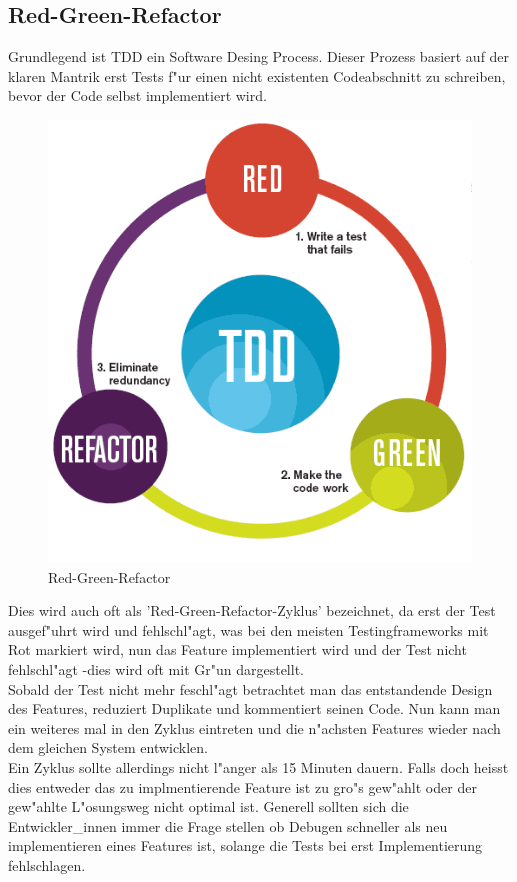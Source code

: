 \documentclass[runningheads,a4paper]{llncs}
\begin{document}
  \subsection{Red-Green-Refactor}
    Grundlegend ist TDD ein Software Desing Process. Dieser Prozess basiert auf 
    der klaren Mantrik erst Tests f"ur einen nicht existenten Codeabschnitt zu
    schreiben, bevor der Code selbst implementiert wird.\\
    \begin{figure}
      \vspace{-30pt}
      \begin{center}
        \includegraphics[scale=0.3]{assets/tdd_flow.png}
      \end{center}
      \caption{Red-Green-Refactor\cite{Osorio:2012}}
      \vspace{-15pt}
    \end{figure}
    Dies wird auch oft als 'Red-Green-Refactor-Zyklus' bezeichnet, da erst der Test
    ausgef"uhrt wird und fehlschl"agt, was bei den meisten Testingframeworks mit 
    Rot markiert wird, nun das Feature implementiert wird und der Test nicht 
    fehlschl"agt -dies wird oft mit Gr"un dargestellt.\\
    Sobald der Test nicht mehr feschl"agt betrachtet man das entstandende Design 
    des Features, reduziert Duplikate und kommentiert seinen Code. Nun kann man 
    ein weiteres mal in den Zyklus eintreten und die n"achsten Features wieder 
    nach dem gleichen System entwicklen.\\
    Ein Zyklus sollte allerdings nicht l"anger als 15 Minuten dauern. Falls doch
    heisst dies entweder das zu implmentierende Feature ist zu gro"s gew"ahlt
    oder der gew"ahlte L"osungsweg nicht optimal ist. Generell 
    sollten sich die Entwickler\_innen immer die Frage stellen ob Debugen 
    schneller als neu implementieren eines Features ist, solange die Tests bei erst
    Implementierung fehlschlagen.
\end{document}

